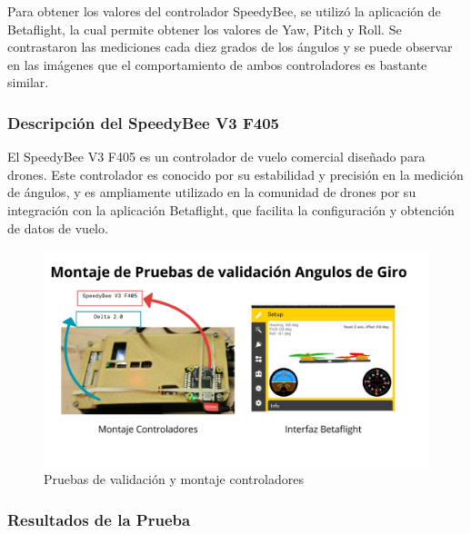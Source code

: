 Para obtener los valores del controlador SpeedyBee, se utilizó la aplicación de Betaflight, la cual permite obtener los valores de Yaw, Pitch y Roll. Se contrastaron las mediciones cada diez grados de los ángulos y se puede observar en las imágenes que el comportamiento de ambos controladores es bastante similar.
\vspace{5 px}
\subsubsection{Descripción del SpeedyBee V3 F405}
\vspace{5 px}
El SpeedyBee V3 F405 es un controlador de vuelo comercial diseñado para drones. Este controlador es conocido por su estabilidad y precisión en la medición de ángulos, y es ampliamente utilizado en la comunidad de drones por su integración con la aplicación Betaflight, que facilita la configuración y obtención de datos de vuelo.
\vspace{5 px}
\begin{figure}[H]
    \centering
    \includegraphics[width=\textwidth]{Imagenes/Pruebas/montajeControladores.png}
    \caption{Pruebas de validación y montaje controladores }
    \label{fig:pruebasPWM}
\end{figure}



\subsubsection{Resultados de la Prueba}



